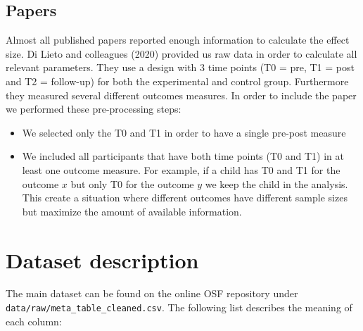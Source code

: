 \documentclass[
]{article}
\providecommand{\tightlist}{%
  \setlength{\itemsep}{0pt}\setlength{\parskip}{0pt}}
\begin{document}
\hypertarget{papers}{%
\subsection{Papers}\label{papers}}

Almost all published papers reported enough information to calculate the effect size. Di Lieto and colleagues (2020) provided us raw data in order to calculate all relevant parameters. They use a design with 3 time points (T0 = pre, T1 = post and T2 = follow-up) for both the experimental and control group. Furthermore they measured several different outcomes measures. In order to include the paper we performed these pre-processing steps:

\begin{itemize}
\tightlist
\item
  We selected only the T0 and T1 in order to have a single pre-post measure
\item
  We included all participants that have both time points (T0 and T1) in at least one outcome measure. For example, if a child has T0 and T1 for the outcome \(x\) but only T0 for the outcome \(y\) we keep the child in the analysis. This create a situation where different outcomes have different sample sizes but maximize the amount of available information.
\end{itemize}

\hypertarget{dataset}{%
\section{Dataset description}\label{dataset}}

The main dataset can be found on the online OSF repository under \texttt{data/raw/meta\_table\_cleaned.csv}. The following list describes the meaning of each column:
\end{document}
